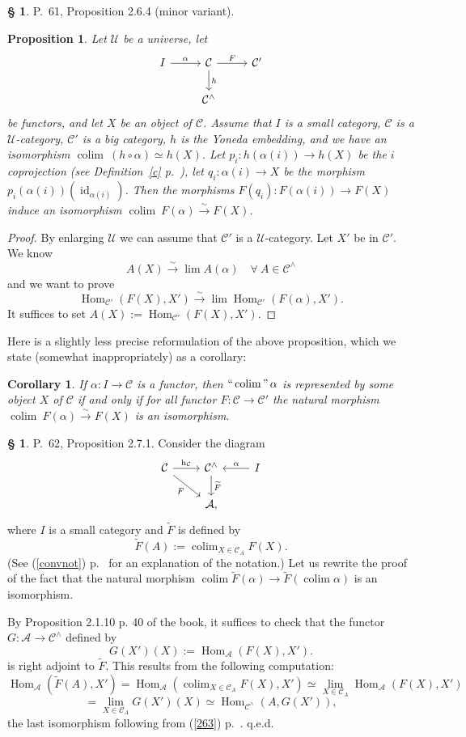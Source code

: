 \documentclass[12pt]{article}
\newtheorem{prop}[thm]{Proposition}
\newtheorem{cor}[thm]{Corollary}
\theoremstyle{remark}
\theoremstyle{definition}
\newtheorem{s}[thm]{\S}
\newcommand{\A}{\mathcal A}
\newcommand{\C}{\mathcal C}
\newcommand{\U}{\mathcal U}
\newcommand{\mv}{ (minor variant)}
\newcommand{\cn}{(See (\ref{convnot}) p.~\pageref{convnot} for an explanation of the notation.) }%
\DeclareMathOperator*{\coli}{colim}
\DeclareMathOperator*{\co}{colim}
\DeclareMathOperator*{\ic}{``\coli"}
\DeclareMathOperator{\hy}{h}
\DeclareMathOperator{\id}{id}
\DeclareMathOperator{\Hom}{Hom}%
\begin{document}
%
%
\begin{s} 
P.~61, Proposition 2.6.4\mv.
%
\begin{prop}\label{264}
Let $\U$ be a universe, let 
$$
\begin{tikzcd}
I\ar{r}{\alpha}&\C\ar{d}{h}\ar{r}{F}&\C'\\
&\C^\wedge
\end{tikzcd}
$$ 
be functors, and let $X$ be an object of $\C$. Assume that $I$ is a small category, $\C$ is a $\U$-category, $\C'$ is a big category, $h$ is the Yoneda embedding, and we have an isomorphism $\co\ (h\circ\alpha)\simeq h(X)$. Let $p_i:h(\alpha(i))\to h(X)$ be the $i$ coprojection (see Definition~\ref{c} p.~\pageref{c}), let $q_i:\alpha(i)\to X$ be the morphism $p_i(\alpha(i))(\id_{\alpha(i)})$. Then the morphisms $F(q_i):F(\alpha(i))\to F(X)$ induce an isomorphism $\co\ F(\alpha)\xrightarrow\sim F(X)$.
\end{prop}
%
\begin{proof}
By enlarging $\U$ we can assume that $\C'$ is a $\U$-category. Let $X'$ be in $\C'$. We know 
$$
A(X)\xrightarrow\sim\lim A(\alpha)\quad\forall\ A\in\C^\wedge 
$$ 
and we want to prove 
$$
\Hom_{\C'}(F(X),X')\xrightarrow\sim\lim\Hom_{\C'}(F(\alpha),X'). 
$$ 
It suffices to set $A(X):=\Hom_{\C'}(F(X),X')$.
\end{proof}

Here is a slightly less precise reformulation of the above proposition, which we state (somewhat inappropriately) as a corollary:
\begin{cor}\label{264b}
If $\alpha:I\to\C$ is a functor, then $\ic\alpha$ is represented by some object $X$ of $\C$ if and only if for all functor $F:\C\to\C'$ the natural morphism $\co\ F(\alpha)\xrightarrow\sim F(X)$ is an isomorphism.
\end{cor}
\end{s}
%
%
\begin{s}\label{c271b}
P.~62, Proposition 2.7.1. Consider the diagram 
$$
\begin{tikzcd}
\C\ar{r}{\hy_\C}\ar{dr}[swap]{F}&\C^\wedge\ar{d}{\widetilde F}&I\ar{l}[swap]{\alpha}\\
&\A,
\end{tikzcd}
$$
where $I$ is a small category and $\widetilde F$ is defined by 
$$
\widetilde F(A):=\coli_{X\in\C_A}F(X). 
$$
\cn Let us rewrite the proof of the fact that the natural morphism $\coli\widetilde F(\alpha)\to\widetilde F\left(\coli\alpha\right)$ is an isomorphism. 

By Proposition 2.1.10 p. 40 of the book, it suffices to check that the functor $G:\A\to\C^\wedge$ defined by 
$$
G(X')(X):=\Hom_{\A}(F(X),X').
$$ 
is right adjoint to $\widetilde F$. This results from the following computation: 
$$
\Hom_{\A}\left(\widetilde F(A),X'\right)=
\Hom_{\A}\left(\coli_{X\in\C_A}F(X),X'\right)\simeq 
\lim_{X\in\C_A}\Hom_{\A}(F(X),X')
$$
$$
=\lim_{X\in\C_A}G(X')(X)\simeq\Hom_{\C^\wedge}(A,G(X')), 
$$ 
the last isomorphism following from (\ref{263}) p.~\pageref{263}. q.e.d.
\end{s}
\end{document}
